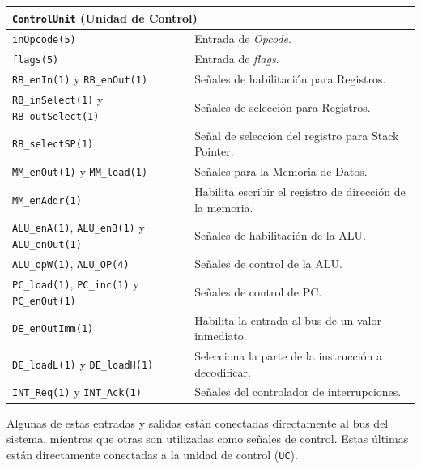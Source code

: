\documentclass[a4paper,11pt]{article}
\begin{document}
\begin{center}
\begin{tabular}{p{6.4cm}|p{8.2cm}}
\multicolumn{2}{l}{ \texttt{ControlUnit} (Unidad de Control) }\\ %
\hline
\texttt{inOpcode(5)}                                                 & Entrada de \emph{Opcode}.\\
\texttt{flags(5)}                                                    & Entrada de \emph{flags}.\\
\texttt{RB\_enIn(1)} y \texttt{RB\_enOut(1)}                         & Señales de habilitación para Registros.\\
\texttt{RB\_inSelect(1)} y \texttt{RB\_outSelect(1)}                 & Señales de selección para Registros.\\
\texttt{RB\_selectSP(1)}                                             & Señal de selección del registro para Stack Pointer.\\
\texttt{MM\_enOut(1)} y \texttt{MM\_load(1)}                         & Señales para la Memoria de Datos.\\
\texttt{MM\_enAddr(1)}                                               & Habilita escribir el registro de dirección de la memoria.\\
\texttt{ALU\_enA(1)}, \texttt{ALU\_enB(1)} y \texttt{ALU\_enOut(1)}  & Señales de habilitación de la ALU.\\
\texttt{ALU\_opW(1)}, \texttt{ALU\_OP(4)}                            & Señales de control de la ALU.\\
\texttt{PC\_load(1)}, \texttt{PC\_inc(1)} y \texttt{PC\_enOut(1)}    & Señales de control de PC.\\
\texttt{DE\_enOutImm(1)}                                             & Habilita la entrada al bus de un valor inmediato.\\
\texttt{DE\_loadL(1)} y \texttt{DE\_loadH(1)}                        & Selecciona la parte de la instrucción a decodificar.\\
\texttt{INT\_Req(1)} y \texttt{INT\_Ack(1)}                          & Señales del controlador de interrupciones.\\
\end{tabular}
\end{center}

\normalsize

Algunas de estas entradas y salidas están conectadas directamente al bus del sistema, mientras que otras son utilizadas como señales de control.
Estas últimas están directamente conectadas a la unidad de control (\texttt{UC}).
\end{document}
